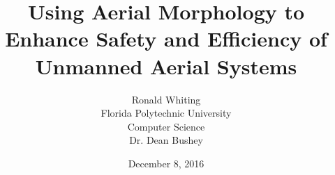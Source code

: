 \documentclass[12 pt, titlepage]{article}
\begin{document}
	\title{Using Aerial Morphology to Enhance Safety and Efficiency of Unmanned Aerial Systems}
	\date{December 8, 2016}
	\author{Ronald Whiting \\ Florida Polytechnic University \\ Computer Science \\ Dr. Dean Bushey}
	\maketitle
	\doublespacing
	
	\clearpage
	\tableofcontents
	\newpage
	\listoffigures
	\newpage
	\listoftables
	\clearpage
	
	
	
	
	
	
	
	
	
	
	
	\newpage
	
	
	
\end{document}
